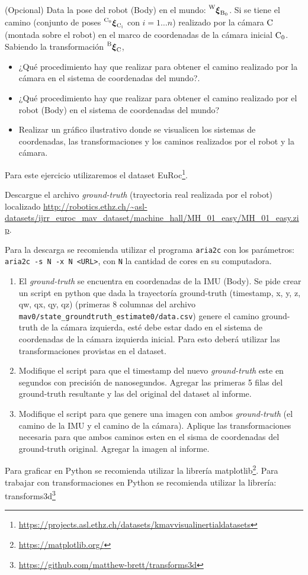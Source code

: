 \documentclass[tp]{lcc}
\begin{document}
\ejercicio (Opcional) Data la pose del robot (Body) en el mundo: $\prescript{\mathrm{\mathrm{W}}}{}{{\boldsymbol{\mathbf{\xi}}}_\mathrm{\mathrm{B}_{0}}}$. Si se tiene el camino (conjunto de poses $\prescript{\mathrm{\mathrm{C}_{0}}}{}{{\boldsymbol{\mathbf{\xi}}}_\mathrm{\mathrm{C}_{i}}}$ con $i = 1 \dots n$) realizado por la cámara $\mathrm{C}$ (montada sobre el robot) en el marco de coordenadas de la cámara inicial $\mathrm{C}_{0}$. Sabiendo la transformación $\prescript{\mathrm{\mathrm{B}}}{}{{\boldsymbol{\mathbf{\xi}}}_\mathrm{\mathrm{C}}}$, 
\begin{itemize}
	\item ¿Qué procedimiento hay que realizar para obtener el camino realizado por la cámara en el sistema de coordenadas del mundo?.
	\item ¿Qué procedimiento hay que realizar para obtener el camino realizado por el robot (Body) en el sistema de coordenadas del mundo?
    \item Realizar un gráfico ilustrativo donde se visualicen los sistemas de coordenadas, las transformaciones y los caminos realizados por el robot y la cámara.
\end{itemize}


\ejercicio Para este ejercicio utilizaremos el dataset EuRoc\footnote{\url{https://projects.asl.ethz.ch/datasets/kmavvisualinertialdatasets}}.

Descargue el archivo \emph{ground-truth} (trayectoria real realizada por el robot) localizado \url{ http://robotics.ethz.ch/~asl-datasets/ijrr_euroc_mav_dataset/machine_hall/MH_01_easy/MH_01_easy.zip}.

\begin{nota}
	Para la descarga se recomienda utilizar el programa \lstinline{aria2c} con los parámetros: \lstinline{aria2c -s N -x N <URL>}, con \lstinline{N} la cantidad de cores en su computadora.
\end{nota}

\begin{enumerate}
    \item El \emph{ground-truth} se encuentra en coordenadas de la IMU (Body). Se pide crear un script en python que dada la trayectoría ground-truth (timestamp, x, y, z, qw, qx, qy, qz) (primeras 8 columnas del archivo \lstinline{mav0/state_groundtruth_estimate0/data.csv}) genere el camino ground-truth de la cámara izquierda, esté debe estar dado en el sistema de coordenadas de la cámara izquierda inicial. Para esto deberá utilizar las transformaciones provistas en el dataset.
    
    \item Modifique el script para que el timestamp del nuevo \emph{ground-truth} este en segundos con precisión de nanosegundos. Agregar las primeras 5 filas del ground-truth resultante y las del original del dataset al informe.
    
    \item Modifique el script para que genere una imagen con ambos \emph{ground-truth} (el camino de la IMU y el camino de la cámara). Aplique las transformaciones necesaria para que ambos caminos esten en el sisma de coordenadas del ground-truth original. Agregar la imagen al informe.
\end{enumerate}

\begin{nota}
	Para graficar en Python se recomienda utilizar la librería matplotlib\footnote{\url{https://matplotlib.org/}}. Para trabajar con transformaciones en Python se recomienda utilizar la librería: transforms3d\footnote{\url{https://github.com/matthew-brett/transforms3d}}
\end{nota}
\end{document}

